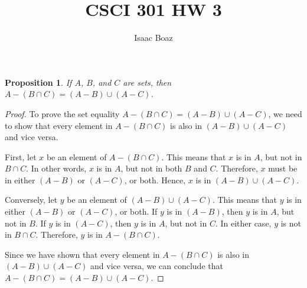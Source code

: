 \documentclass{article}
\title{\vspace{-5ex}CSCI 301 HW 3}
\author{Isaac Boaz}
\newtheorem*{theorem}{Proposition}
\begin{document}
\maketitle

\begin{theorem}
    If $A$, $B$, and $C$ are sets, then $A - (B \cap C) = (A - B) \cup (A - C)$.
\end{theorem}

\begin{proof}
To prove the set equality $A - (B \cap C) = (A - B) \cup (A - C)$, we need to show that every element in $A - (B \cap C)$ is also in $(A - B) \cup (A - C)$ and vice versa. 

First, let $x$ be an element of $A - (B \cap C)$. This means that $x$ is in $A$, but not in $B \cap C$. In other words, $x$ is in $A$, but not in both $B$ and $C$. Therefore, $x$ must be in either $(A - B)$ or $(A - C)$, or both. Hence, $x$ is in $(A - B) \cup (A - C)$. 

Conversely, let $y$ be an element of $(A - B) \cup (A - C)$. This means that $y$ is in either $(A - B)$ or $(A - C)$, or both. If $y$ is in $(A - B)$, then $y$ is in $A$, but not in $B$. If $y$ is in $(A - C)$, then $y$ is in $A$, but not in $C$. In either case, $y$ is not in $B \cap C$. Therefore, $y$ is in $A - (B \cap C)$. 

Since we have shown that every element in $A - (B \cap C)$ is also in $(A - B) \cup (A - C)$ and vice versa, we can conclude that $A - (B \cap C) = (A - B) \cup (A - C)$. 
\end{proof}
\end{document}
